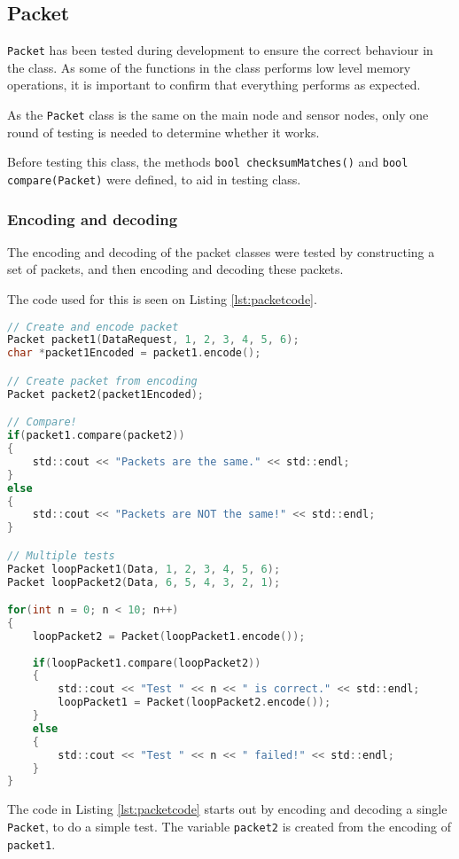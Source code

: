 \subsection{Packet}
\texttt{Packet} has been tested during development to ensure the correct behaviour in the class. As some of the functions in the class performs low level memory operations, it is important to confirm that everything performs as expected.

As the \texttt{Packet} class is the same on the main node and sensor nodes, only one round of testing is needed to determine whether it works.

Before testing this class, the methods \texttt{bool checksumMatches()} and \texttt{bool compare(Packet)} were defined, to aid in testing class.

\subsubsection*{Encoding and decoding}
The encoding and decoding of the packet classes were tested by constructing a set of packets, and then encoding and decoding these packets.


The code used for this is seen on Listing \ref{lst:packetcode}.

\begin{lstlisting}[language=C,label={lst:packetcode},caption={Testing packet encoding/decoding}]
// Create and encode packet
Packet packet1(DataRequest, 1, 2, 3, 4, 5, 6);
char *packet1Encoded = packet1.encode();

// Create packet from encoding
Packet packet2(packet1Encoded);

// Compare!
if(packet1.compare(packet2))
{
    std::cout << "Packets are the same." << std::endl;
}
else
{
    std::cout << "Packets are NOT the same!" << std::endl;
}

// Multiple tests
Packet loopPacket1(Data, 1, 2, 3, 4, 5, 6);
Packet loopPacket2(Data, 6, 5, 4, 3, 2, 1);

for(int n = 0; n < 10; n++)
{
    loopPacket2 = Packet(loopPacket1.encode());
    
    if(loopPacket1.compare(loopPacket2))
    {
        std::cout << "Test " << n << " is correct." << std::endl;
        loopPacket1 = Packet(loopPacket2.encode());
    }
    else
    {
        std::cout << "Test " << n << " failed!" << std::endl;
    }
}
\end{lstlisting}
The code in Listing \ref{lst:packetcode} starts out by encoding and decoding a single \texttt{Packet}, to do a simple test. The variable \texttt{packet2} is created from the encoding of \texttt{packet1}. 

